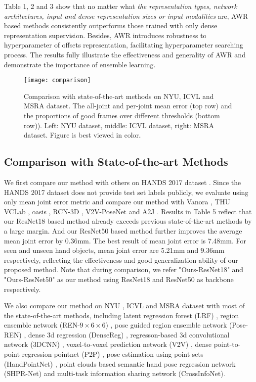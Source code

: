 \documentclass[letterpaper]{article} \usepackage{aaai20}  \usepackage{times}  \usepackage{helvet} \usepackage{courier}  \usepackage[hyphens]{url}  \usepackage{graphicx} \usepackage{amsmath}
\begin{document}
Table 1, 2 and 3 show that no matter what \textit{the representation types, network architectures, input and dense representation sizes or input modalities} are, AWR based methods consistently outperforms those trained with only dense representation supervision. Besides, AWR introduces robustness to hyperparameter of offsets representation, facilitating hyperparameter searching process. The results fully illustrate the effectiveness and generality of AWR and demonstrate the importance of ensemble learning. 


\begin{figure*}[t]
\centering
\texttt{[image: comparison]} 
\caption{Comparison with state-of-the-art methods on NYU, ICVL and MSRA dataset. The all-joint and per-joint mean error (top row) and the proportions of good frames over different thresholds (bottom row)). Left: NYU dataset, middle: ICVL dataset, right: MSRA dataset. Figure is best viewed in color.}
\end{figure*}

\subsection{Comparison with State-of-the-art Methods}

We first compare our method with others on HANDS 2017 dataset \cite{hands17}. Since the HANDS 2017 dataset does not provide test set labels publicly, we evaluate using only mean joint error metric and compare our method with Vanora \cite{vanora}, THU VCLab \cite{pose}, oasis \cite{handpointnet}, RCN-3D \cite{vanora}, V2V-PoseNet \cite{v2v} and A2J \cite{a2j}. Results in Table 5 reflect that our ResNet18 based method already exceeds previous state-of-the-art methods by a large margin. And our ResNet50 based method further improves the average mean joint error by 0.36mm. The best result of mean joint error is 7.48mm. For seen and unseen hand objects, mean joint error are 5.21mm and 9.36mm respectively, reflecting the effectiveness and good generalization ability of our proposed method. Note that during comparison, we refer "Ours-ResNet18" and "Ours-ResNet50" as our method using ResNet18 and ResNet50 as backbone respectively.  

We also compare our method on NYU \cite{nyu}, ICVL \cite{icvl} and MSRA \cite{offset2} dataset with most of the state-of-the-art methods, including latent regression forest (LRF) \cite{lrf}, region ensemble network (REN-$9\times6\times6$) \cite{ren}, pose guided region ensemble network (Pose-REN) \cite{pose}, dense 3d regression (DenseReg) \cite{dense3d}, regresson-based 3d convolutional network (3DCNN) \cite{3dcnn}, voxel-to-voxel prediction network (V2V) \cite{v2v}, dense point-to-point regression pointnet (P2P) \cite{p2p}, pose estimation using point sets (HandPointNet) \cite{handpointnet}, point clouds based semantic hand pose regression network (SHPR-Net) \cite{shpr} and multi-task information sharing network (CrossInfoNet)\cite{crossinfonet}. 
\end{document}

